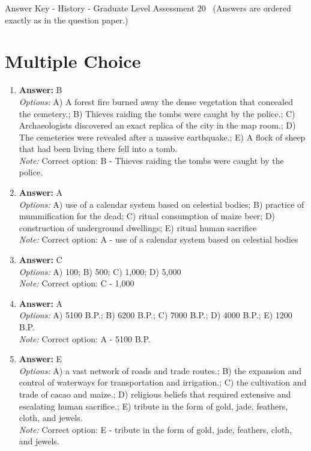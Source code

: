 \documentclass[12pt]{article}
\begin{document}
\begin{center}
Answer Key - History - Graduate Level Assessment 20 \
\small (Answers are ordered exactly as in the question paper.)
\end{center}

\section*{Multiple Choice}
\begin{enumerate}[label=\arabic*.]
\item \textbf{Answer:} B
\\ \textit{Options:} A) A forest fire burned away the dense vegetation that concealed the cemetery.; B) Thieves raiding the tombs were caught by the police.; C) Archaeologists discovered an exact replica of the city in the map room.; D) The cemeteries were revealed after a massive earthquake.; E) A flock of sheep that had been living there fell into a tomb.
\\ \textit{Note:} Correct option: B - Thieves raiding the tombs were caught by the police.
\item \textbf{Answer:} A
\\ \textit{Options:} A) use of a calendar system based on celestial bodies; B) practice of mummification for the dead; C) ritual consumption of maize beer; D) construction of underground dwellings; E) ritual human sacrifice
\\ \textit{Note:} Correct option: A - use of a calendar system based on celestial bodies
\item \textbf{Answer:} C
\\ \textit{Options:} A) 100; B) 500; C) 1,000; D) 5,000
\\ \textit{Note:} Correct option: C - 1,000
\item \textbf{Answer:} A
\\ \textit{Options:} A) 5100 B.P.; B) 6200 B.P.; C) 7000 B.P.; D) 4000 B.P.; E) 1200 B.P.
\\ \textit{Note:} Correct option: A - 5100 B.P.
\item \textbf{Answer:} E
\\ \textit{Options:} A) a vast network of roads and trade routes.; B) the expansion and control of waterways for transportation and irrigation.; C) the cultivation and trade of cacao and maize.; D) religious beliefs that required extensive and escalating human sacrifice.; E) tribute in the form of gold, jade, feathers, cloth, and jewels.
\\ \textit{Note:} Correct option: E - tribute in the form of gold, jade, feathers, cloth, and jewels.
\end{enumerate}
\end{document}

